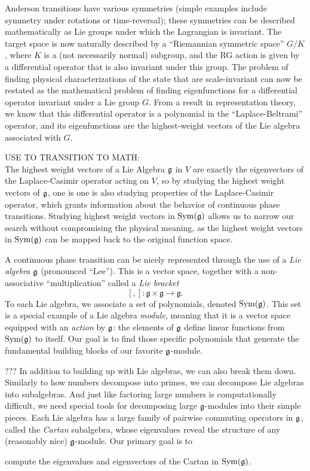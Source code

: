 \documentclass[11pt, reqno]{amsart}
\begin{document}
Anderson transitions have various symmetries (simple examples include symmetry under rotations or time-reversal); these symmetries can be described mathematically as Lie groups under which the Lagrangian is invariant. The target space is now naturally described by a ``Riemannian symmetric space'' $G/K$, where $K$ is a (not necessarily normal) subgroup, and the RG action is given by a differential operator that is also invariant under this group. The problem of finding physical characterizations of the state that are scale-invariant can now be restated as the mathematical problem of finding eigenfunctions for a differential operator invariant under a Lie group $G$. From a result in representation theory, we know that this differential operator is a polynomial in the ``Laplace-Beltrami'' operator, and its eigenfunctions are the highest-weight vectors of the Lie algebra associated with $G.$

USE TO TRANSITION TO MATH:\\
The highest weight vectors of a Lie Algebra $\mathfrak{g}$ in $V$ are exactly the eigenvectors 
of the Laplace-Casimir operator acting on $V$, so by studying the highest weight  
vectors of $\mathfrak{g}$, one is one is also studying properties of the Laplace-Casimir 
operator, which grants information about the behavior of continuous phase transitions. 
Studying highest weight vectors in $\operatorname{Sym}(\mathfrak{g})$ allows us to narrow our search without
compromising the physical meaning, as the highest weight vectors in $\operatorname{Sym}(\mathfrak{g})$ can be mapped back to the original function space. 



A continuous phase transition can be nicely represented through the use of a \emph{Lie algebra} $\mathfrak{g}$ (pronounced ``Lee''). This is a vector space, together with a non-associative ``multiplication'' called a \emph{Lie bracket}
\[[,]: \mathfrak{g} \times \mathfrak{g} \rightarrow \mathfrak{g}.\]
To each Lie algebra, we associate a set of polynomials, denoted $\operatorname{Sym}(\mathfrak{g})$. This set is a special example of a Lie algebra \emph{module}, meaning that it is a vector space equipped with an \emph{action} by $\mathfrak{g}$: the elements of $\mathfrak{g}$ define linear functions from $\operatorname{Sym}(\mathfrak{g})$ to itself. Our goal is to find those specific polynomials that generate the fundamental building blocks of our favorite $\mathfrak{g}$-module.


??? In addition to building up with Lie algebras, we can also break them down.
Similarly to how numbers decompose into primes, we can decompose Lie algebras into subalgebras. And just like factoring large numbers is computationally difficult, we need special tools for decomposing large $\mathfrak{g}$-modules into their simple pieces. Each Lie algebra has a large family of pairwise commuting operators in $\mathfrak{g}$, called the \emph{Cartan} subalgebra, whose eigenvalues reveal the structure of any (reasonably nice) $\mathfrak{g}$-module. Our primary goal is to
\begin{center} compute the eigenvalues and eigenvectors of the Cartan in $\operatorname{Sym}(\mathfrak{g})$. \end{center}
\end{document}
